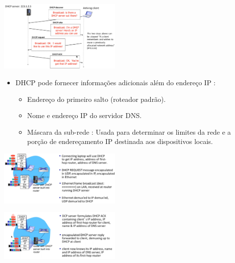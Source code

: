             \begin{center}
                \includegraphics[width=0.45\textwidth]{img/cap-04/dhcp2.png}
            \end{center}

            \begin{itemize}[left=0.5cm, align=left, nosep]
                \item DHCP pode fornecer informações adicionais além do endereço IP :
                    \begin{itemize}[left=0.5cm, nosep, label=$\hookrightarrow$]
                        \item Endereço do primeiro salto (roteador padrão).
                        \item Nome e endereço IP do servidor DNS.
                        \item Máscara da sub-rede : Usada para determinar os limites da rede e a porção de endereçamento IP destinada aos dispositivos locais.
                    \end{itemize}    
                \end{itemize}

            \begin{center}
                \includegraphics[width=0.45\textwidth]{img/cap-04/dhcp-exemplo.png}
            \end{center}

            \begin{center}
                \includegraphics[width=0.45\textwidth]{img/cap-04/dhcp-exemplo2.png}
            \end{center}


